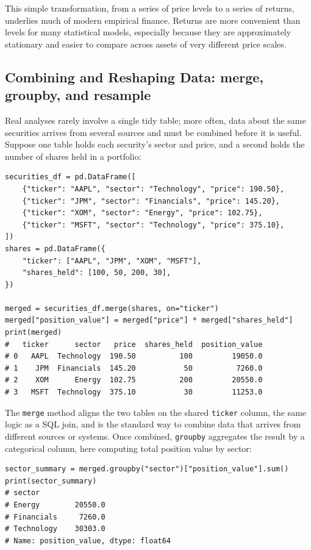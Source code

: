\documentclass[../ai_in_finance]{subfiles}
\begin{document}
This simple transformation, from a series of price levels to a series of returns, underlies much of modern empirical finance. Returns are more convenient than levels for many statistical models, especially because they are approximately stationary and easier to compare across assets of very different price scales.

\subsection{Combining and Reshaping Data: merge, groupby, and resample}

Real analyses rarely involve a single tidy table; more often, data about the same securities arrives from several sources and must be combined before it is useful. Suppose one table holds each security's sector and price, and a second holds the number of shares held in a portfolio:

\begin{verbatim}
securities_df = pd.DataFrame([
    {"ticker": "AAPL", "sector": "Technology", "price": 190.50},
    {"ticker": "JPM", "sector": "Financials", "price": 145.20},
    {"ticker": "XOM", "sector": "Energy", "price": 102.75},
    {"ticker": "MSFT", "sector": "Technology", "price": 375.10},
])
shares = pd.DataFrame({
    "ticker": ["AAPL", "JPM", "XOM", "MSFT"],
    "shares_held": [100, 50, 200, 30],
})

merged = securities_df.merge(shares, on="ticker")
merged["position_value"] = merged["price"] * merged["shares_held"]
print(merged)
#   ticker      sector   price  shares_held  position_value
# 0   AAPL  Technology  190.50          100         19050.0
# 1    JPM  Financials  145.20           50          7260.0
# 2    XOM      Energy  102.75          200         20550.0
# 3   MSFT  Technology  375.10           30         11253.0
\end{verbatim}

The \texttt{merge} method aligns the two tables on the shared \texttt{ticker} column, the same logic as a SQL join, and is the standard way to combine data that arrives from different sources or systems. Once combined, \texttt{groupby} aggregates the result by a categorical column, here computing total position value by sector:

\begin{verbatim}
sector_summary = merged.groupby("sector")["position_value"].sum()
print(sector_summary)
# sector
# Energy        20550.0
# Financials     7260.0
# Technology    30303.0
# Name: position_value, dtype: float64
\end{verbatim}
\end{document}
